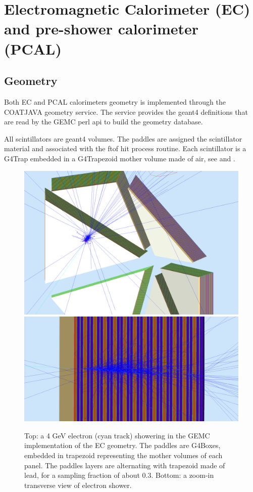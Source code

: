 \section{Electromagnetic Calorimeter (EC) and pre-shower calorimeter (PCAL)}

\subsection{Geometry}

Both EC and PCAL calorimeters geometry is implemented through the COATJAVA geometry service.
The service provides the geant4 definitions that are read by the GEMC perl api to build the geometry database.

All scintillators are geant4 volumes. The paddles are assigned the scintillator material and associated with the ftof hit process routine.
Each scintillator is a G4Trap embedded in a G4Trapezoid mother volume made of air, see  and  .

\begin{figure}
	\centering
	\includegraphics[width=0.95\columnwidth,keepaspectratio]{img/ecGeometry.png}
	\includegraphics[width=0.95\columnwidth,keepaspectratio]{img/ecDetail.png}
	\caption{Top: a 4 GeV electron (cyan track) showering in the GEMC implementation of the EC geometry.
            The paddles are G4Boxes, embedded in trapezoid representing the mother volumes of each panel.
            The paddles layers are alternating with trapezoid made of lead, for a sampling fraction of about 0.3.
            Bottom: a zoom-in transverse view of electron shower.}
	\label{fig:ecGeometry}
\end{figure}

